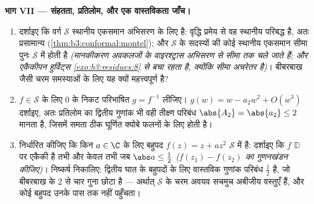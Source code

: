 \begin{problem}
\begin{enumerate}[resume]
\end{enumerate}
\medskip
\noindent\textbf{भाग VII --- संहतता, प्रतिलोम, और एक वास्तविकता
जाँच।}
\begin{enumerate}[resume]
  \item दर्शाइए कि वर्ग $\mathcal S$ स्थानीय एकसमान अभिसरण के लिए
        \emph{} है: वृद्धि प्रमेय से वह स्थानीय परिबद्ध है,
        अतः प्रसामान्य (\cref{thm:b3:conformal:montel}); और $\mathcal S$ के सदस्यों की कोई
        स्थानीय एकसमान सीमा पुनः $\mathcal S$ में होती है
        \emph{(मानकीकरण अवकलजों के वाइरश्ट्रास अभिसरण से सीमा तक
        चले जाते हैं; और एकैकीपन हुर्विट्स \cref{exo:b3:residues:8} से बचा रहता है,
        क्योंकि सीमा अचरेतर है)}। बीबरबाख जैसी चरम समस्याओं के
        लिए यह क्यों महत्त्वपूर्ण है?
  \item $f \in \mathcal S$ के लिए $0$ के निकट परिभाषित $g = f^{-1}$ लीजिए। $g(w) = w - a_2w^2 + O(w^3)$
        दर्शाइए, अतः प्रतिलोम का द्वितीय गुणांक भी वही तीक्ष्ण
        परिबंध $\abs{A_2} = \abs{a_2} \leq 2$ मानता है, जिसमें समता ठीक घूर्णित क्योबे
        फलनों के लिए होती है।
  \item निर्धारित कीजिए कि किन $a \in \C$ के लिए बहुपद $f(z)
        = z + az^2$ $\mathcal S$ में
        है: दर्शाइए कि $f$ $\mathbb D$ पर एकैकी है तभी और केवल तभी जब
        $\abs a \leq \frac12$ \emph{($f(z_1) - f(z_2)$ का गुणनखंडन कीजिए)}। निष्कर्ष निकालिए:
        द्वितीय घात के बहुपदों के लिए वास्तविक गुणांक परिबंध
        $\frac12$ है, जो बीबरबाख के $2$ से चार गुना छोटा है ---
        अर्थात् $\mathcal S$ के चरम अवयव सचमुच अबीजीय वस्तुएँ हैं, और
        कोई बहुपद उनके पास तक नहीं पहुँचता।
\end{enumerate}
\end{problem}
